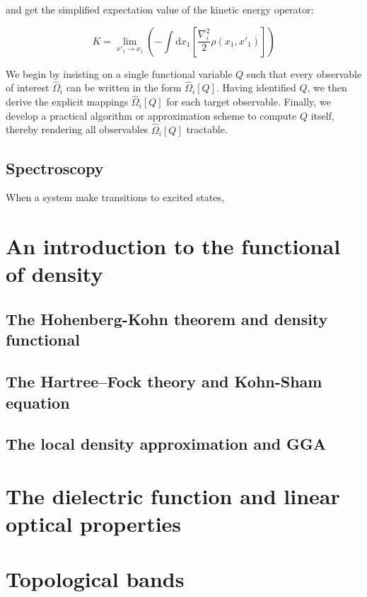 and get the simplified expectation value of the kinetic energy operator:

\begin{equation}
K= \lim_{x'_1\to x_1}\left( -\int\mathrm{d}x_1\left[\frac{\nabla_i^2}{2}\rho(x_1,x'_1) \right]\right)
\label{kinetic_energy_density_matrix}
\end{equation}

We begin by insisting on a single functional variable $Q$ such that every observable of interest $\hat\Omega_i$ can be written in the form $\hat\Omega_i[Q]$. Having identified $Q$, we then derive the explicit mappings $\hat\Omega_i[Q]$ for each target observable. Finally, we develop a practical algorithm or approximation scheme to compute $Q$ itself, thereby rendering all observables $\hat\Omega_i[Q]$ tractable.


\subsection{Spectroscopy}

When a system make transitions to excited states, 






\newpage
\section{An introduction to the functional of density}

\subsection{The Hohenberg-Kohn theorem and density functional}

\subsection{The Hartree–Fock theory and Kohn-Sham equation}

\subsection{The local density approximation and GGA}

\newpage
\section{The dielectric function and linear optical properties}

\newpage
\section{Topological bands}
